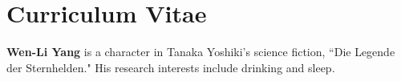 \chapter*{Curriculum Vitae}
{\bf Wen-Li Yang} is a character in Tanaka Yoshiki's science fiction, ``Die Legende der Sternhelden." His research interests include drinking and sleep.